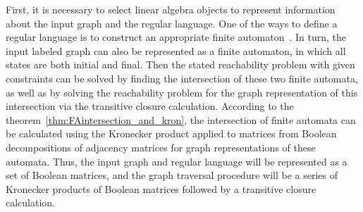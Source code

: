 First, it is necessary to select linear algebra objects to represent information about the input graph and the regular language. One of the ways to define a regular language is to construct an appropriate finite automaton~\cite{hopcroft2001introduction}. In turn, the input labeled graph can also be represented as a finite automaton, in which all states are both initial and final. Then the stated reachability problem with given constraints can be solved by finding the intersection of these two finite automata, as well as by solving the reachability problem for the graph representation of this intersection via the transitive closure calculation. According to the theorem~\ref{thm:FAintersection_and_kron}, the intersection of finite automata can be calculated using the Kronecker product applied to matrices from Boolean decompositions of adjacency matrices for graph representations of these automata. Thus, the input graph and regular language will be represented as a set of Boolean matrices, and the graph traversal procedure will be a series of Kronecker products of Boolean matrices followed by a transitive closure calculation.

